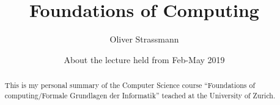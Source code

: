\documentclass{article}
\title{Foundations of Computing}
\author{Oliver Strassmann}
\date{About the lecture held from Feb-May 2019}
\begin{document}
\maketitle

\newpage

\begin{abstract} 
This is my personal summary of the Computer Science course ``Foundations of computing/Formale Grundlagen der Informatik'' teached at the University of Zurich.
\end{abstract}
 
\tableofcontents
\end{document}

